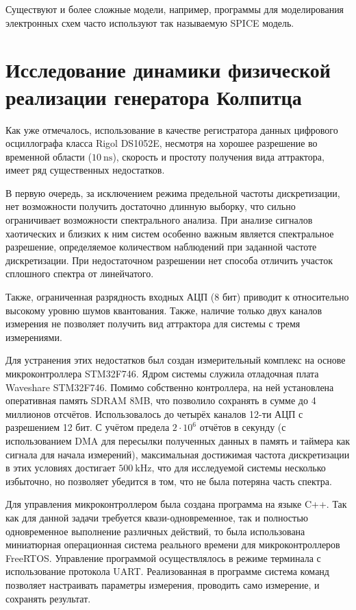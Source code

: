 Существуют и более сложные модели, например,
программы для моделирования электронных схем часто используют так называемую SPICE модель.



\section{Исследование динамики физической реализации генератора Колпитца} %


Как уже отмечалось, использование в качестве регистратора данных
цифрового осциллографа класса Rigol DS1052E,
несмотря на  хорошее разрешение во временной области ($\SI{10}{\nano\second}$),
скорость и простоту получения вида аттрактора,
имеет ряд существенных недостатков.

В первую очередь, за исключением режима предельной частоты дискретизации,
нет возможности получить достаточно длинную выборку, что
сильно ограничивает возможности спектрального анализа.
При анализе сигналов хаотических и близких к ним систем
особенно важным является спектральное разрешение,
определяемое количеством наблюдений при заданной частоте дискретизации.
При недостаточном разрешении нет способа отличить участок сплошного спектра
от линейчатого.

Также, ограниченная разрядность входных АЦП (8 бит)
приводит к относительно высокому уровню шумов квантования.
Также, наличие только двух каналов измерения не позволяет
получить вид аттрактора для системы с тремя измерениями.

Для устранения этих недостатков был создан
измерительный комплекс на основе
микроконтроллера STM32F746.
Ядром системы служила отладочная плата Waveshare STM32F746.
Помимо собственно контроллера, на ней установлена оперативная память
SDRAM 8MB, что позволило сохранять в сумме до 4 миллионов отсчётов.
Использовалось до четырёх каналов 12-ти АЦП с разрешением 12 бит.
С учётом предела $2 \cdot 10^6$ отчётов в секунду
(с использованием DMA для пересылки полученных данных в память и таймера как сигнала для начала измерений),
максимальная достижимая частота дискретизации в этих условиях достигает $\SI{500}{\kilo\hertz}$,
что для исследуемой системы несколько избыточно,
но позволяет убедится в том, что не была потеряна часть спектра.

Для управления микроконтроллером была создана программа
на языке C++. Так как для данной задачи требуется
квази-одновременное, так и полностью одновременное выполнение
различных действий, то была использована миниатюрная операционная
система реального времени для микроконтроллеров FreeRTOS.
Управление программой осуществлялось в режиме терминала
с использование протокола UART. Реализованная
в программе система команд позволяет настраивать параметры измерения,
проводить само измерение, и сохранять результат.

